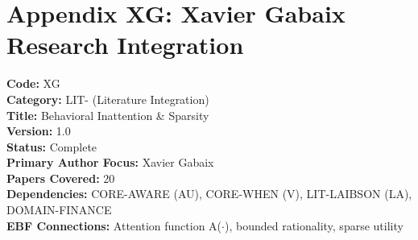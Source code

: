 
\chapter*{Appendix XG: Xavier Gabaix Research Integration}
\label{app:gabaix}

\begin{tcolorbox}[colback=blue!5!white, colframe=blue!75!black, title=Appendix Metadata]
\textbf{Code:} XG \\
\textbf{Category:} LIT- (Literature Integration) \\
\textbf{Title:} Behavioral Inattention \& Sparsity \\
\textbf{Version:} 1.0 \\
\textbf{Status:} Complete \\
\textbf{Primary Author Focus:} Xavier Gabaix \\
\textbf{Papers Covered:} 20 \\
\textbf{Dependencies:} CORE-AWARE (AU), CORE-WHEN (V), LIT-LAIBSON (LA), DOMAIN-FINANCE \\
\textbf{EBF Connections:} Attention function A($\cdot$), bounded rationality, sparse utility
\end{tcolorbox}

